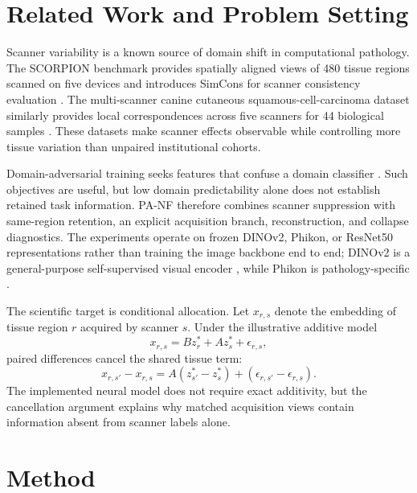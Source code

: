 \documentclass[10pt]{article}
\begin{document}
\section{Related Work and Problem Setting}
Scanner variability is a known source of domain shift in computational pathology. The SCORPION benchmark provides spatially aligned views of 480 tissue regions scanned on five devices and introduces SimCons for scanner consistency evaluation \citep{ryu2025scorpion}. The multi-scanner canine cutaneous squamous-cell-carcinoma dataset similarly provides local correspondences across five scanners for 44 biological samples \citep{wilm2023multiscanner}. These datasets make scanner effects observable while controlling more tissue variation than unpaired institutional cohorts.

Domain-adversarial training seeks features that confuse a domain classifier \citep{ganin2016dann}. Such objectives are useful, but low domain predictability alone does not establish retained task information. PA-NF therefore combines scanner suppression with same-region retention, an explicit acquisition branch, reconstruction, and collapse diagnostics. The experiments operate on frozen DINOv2, Phikon, or ResNet50 representations rather than training the image backbone end to end; DINOv2 is a general-purpose self-supervised visual encoder \citep{oquab2023dinov2}, while Phikon is pathology-specific \citep{filiot2023phikon}.

The scientific target is conditional allocation. Let $x_{r,s}$ denote the embedding of tissue region $r$ acquired by scanner $s$. Under the illustrative additive model
\begin{equation}
 x_{r,s}=Bz_{r}^{*}+Az_{s}^{*}+\epsilon_{r,s},
\end{equation}
paired differences cancel the shared tissue term:
\begin{equation}
 x_{r,s'}-x_{r,s}=A(z_{s'}^{*}-z_{s}^{*})+(\epsilon_{r,s'}-\epsilon_{r,s}).
\end{equation}
The implemented neural model does not require exact additivity, but the cancellation argument explains why matched acquisition views contain information absent from scanner labels alone.

\section{Method}
\end{document}

